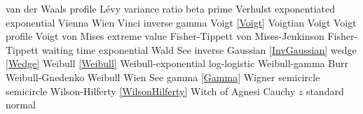 %
van der Waals profile 			\dotfill	L\'{e}vy 							\ncite	%
variance ratio					\dotfill	beta prime 							\ncite	%
Verhulst						\dotfill	exponentiated exponential			
Vienna 							\dotfill	Wien 								\ncite	%
Vinci 							\dotfill	inverse gamma 						\ncite	%
Voigt							\dotfill	\eqref{Voigt}						\ncite
Voigtian						\dotfill	Voigt								\ncite
Voigt profile					\dotfill	Voigt								\ncite
von Mises extreme value			\dotfill	Fisher-Tippett 						\ncite	%
von Mises-Jenkinson 			\dotfill	Fisher-Tippett 						\ncite	%
%
waiting time					\dotfill	exponential 						\ncite	%
Wald							\dotfill	See inverse Gaussian	 \eqref{InvGaussian}				\ncite	%
wedge							\dotfill	\eqref{Wedge}  						\ncite	%
Weibull 						\dotfill	\eqref{Weibull} 					\ncite	%
Weibull-exponential 			\dotfill	log-logistic 						\ncite	%
Weibull-gamma					\dotfill	Burr								\ncite	%
Weibull-Gnedenko				\dotfill	Weibull 							\ncite	%
Wien							\dotfill	See gamma \eqref{Gamma}				\ncite	%
Wigner semicircle				\dotfill	semicircle 							\ncite	%
Wilson-Hilferty					\dotfill	\eqref{WilsonHilferty} 				\ncite	%
Witch of Agnesi					\dotfill	Cauchy									%
%	
$z$								\dotfill	standard normal 					\ncite	%



\clearpage

